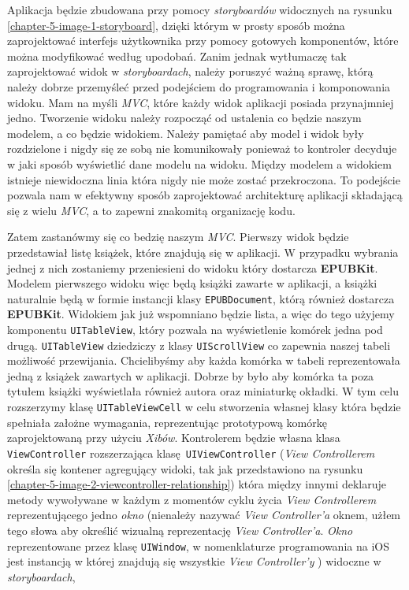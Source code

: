 Aplikacja będzie zbudowana przy pomocy \textit{storyboardów} widocznych na rysunku \ref{chapter-5-image-1-storyboard}, dzięki którym w prosty sposób można zaprojektować interfejs użytkownika przy pomocy gotowych komponentów, które można modyfikować według upodobań. Zanim jednak wytłumaczę tak zaprojektować widok w \textit{storyboardach}, należy poruszyć ważną sprawę, którą należy dobrze przemyśleć przed podejściem do programowania i komponowania widoku. Mam na myśli \textit{MVC}, które każdy widok aplikacji posiada przynajmniej jedno. Tworzenie widoku należy rozpocząć od ustalenia co będzie naszym modelem, a co będzie widokiem. Należy pamiętać aby model i widok były rozdzielone i nigdy się ze sobą nie komunikowały ponieważ to kontroler decyduje w jaki sposób wyświetlić dane modelu na widoku. Między modelem a widokiem istnieje niewidoczna linia która nigdy nie może zostać przekroczona. To podejście pozwala nam w efektywny sposób zaprojektować architekturę aplikacji składającą się z wielu \textit{MVC}, a to zapewni znakomitą organizację kodu.

Zatem zastanówmy się co bedzię naszym \textit{MVC}. Pierwszy widok będzie przedstawiał listę książek, które znajdują się w aplikacji. W przypadku wybrania jednej z nich zostaniemy przeniesieni do widoku który dostarcza \textbf{EPUBKit}. Modelem pierwszego widoku więc będą książki zawarte w aplikacji, a książki naturalnie będą w formie instancji klasy \texttt{EPUBDocument}, którą również dostarcza \textbf{EPUBKit}. Widokiem jak już wspomniano będzie lista, a więc do tego użyjemy komponentu \texttt{UITableView}, który pozwala na wyświetlenie komórek jedna pod drugą. \texttt{UITableView} dziedziczy z klasy \texttt{UIScrollView} co zapewnia naszej tabeli możliwość przewijania. Chcielibyśmy aby każda komórka w tabeli reprezentowała jedną z książek zawartych w aplikacji. Dobrze by było aby komórka ta poza tytułem książki wyświetlała również autora oraz miniaturkę okładki. W tym celu rozszerzymy klasę \texttt{UITableViewCell} w celu stworzenia własnej klasy która będzie spełniała założne wymagania, reprezentując prototypową komórkę zaprojektowaną przy użyciu \textit{Xibów}. Kontrolerem będzie własna klasa \texttt{ViewController} rozszerzająca klasę \texttt{UIViewController} (\textit{View Controllerem} określa się kontener agregujący widoki, tak jak przedstawiono na rysunku \ref{chapter-5-image-2-viewcontroller-relationship}) która między innymi deklaruje metody wywoływane w każdym z momentów cyklu życia \textit{View Controllerem} reprezentującego jedno \textit{okno} (nienależy nazywać \textit{View Controller’a} oknem, użłem tego słowa aby określić wizualną reprezentację \textit{View Controller’a}. \textit{Okno} reprezentowane przez klasę \texttt{UIWindow}, w nomenklaturze programowania na iOS jest instancją w której znajdują się wszystkie \textit{View Controller’y} ) widoczne w \textit{storyboardach},

